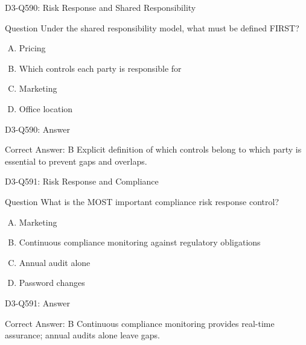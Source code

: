 \documentclass{beamer}
\begin{document}
	\begin{frame}{D3-Q590: Risk Response and Shared Responsibility}
		\begin{block}{Question}
			Under the shared responsibility model, what must be defined FIRST?
		\end{block}
		\begin{enumerate}[(A)]
			\item Pricing
			\item Which controls each party is responsible for
			\item Marketing
			\item Office location
		\end{enumerate}
	\end{frame}
	\begin{frame}{D3-Q590: Answer}
		\begin{block}{Correct Answer: B}
			Explicit definition of which controls belong to which party is essential to prevent gaps and overlaps.
		\end{block}
	\end{frame}
	
	\begin{frame}{D3-Q591: Risk Response and Compliance}
		\begin{block}{Question}
			What is the MOST important compliance risk response control?
		\end{block}
		\begin{enumerate}[(A)]
			\item Marketing
			\item Continuous compliance monitoring against regulatory obligations
			\item Annual audit alone
			\item Password changes
		\end{enumerate}
	\end{frame}
	\begin{frame}{D3-Q591: Answer}
		\begin{block}{Correct Answer: B}
			Continuous compliance monitoring provides real-time assurance; annual audits alone leave gaps.
		\end{block}
	\end{frame}
	
\end{document}

